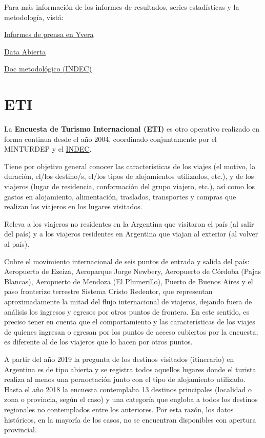 \documentclass[
  openany]{book}
\begin{document}
Para más información de los informes de resultados, series estadísticas y la metodología, vistá:

\href{https://www.yvera.tur.ar/estadistica/info/encuesta-de-ocupacion-hotelera-eoh}{Informes de prensa en Yvera}

\href{http://datos.yvera.tur.ar/dataset/encuesta-ocupacion-hotelera-parahotelera-eoh}{Data Abierta}

\href{https://www.indec.gob.ar/ftp/cuadros/economia/eoh_aspectos_metodologicos.pdf}{Doc metodológico (INDEC)}

\hypertarget{eti}{%
\section{ETI}\label{eti}}

La \textbf{Encuesta de Turismo Internacional (ETI)} es otro operativo realizado en forma continua desde el año 2004, coordinado conjuntamente por el MINTURDEP y el \href{https://www.indec.gob.ar/indec/web/Nivel4-Tema-3-13-55}{INDEC}.

Tiene por objetivo general conocer las características de los viajes (el motivo, la duración, el/los destino/s, el/los tipos de alojamientos utilizados, etc.), y de los viajeros (lugar de residencia, conformación del grupo viajero, etc.), así como los gastos en alojamiento, alimentación, traslados, transportes y compras que realizan los viajeros en los lugares visitados.

Releva a los viajeros no residentes en la Argentina que visitaron el país (al salir del país) y a los viajeros residentes en Argentina que viajan al exterior (al volver al país).

Cubre el movimiento internacional de seis puntos de entrada y salida del país: Aeropuerto de Ezeiza, Aeroparque Jorge Newbery, Aeropuerto de Córdoba (Pajas Blancas), Aeropuerto de Mendoza (El Plumerillo), Puerto de Buenos Aires y el paso fronterizo terrestre Sistema Cristo Redentor, que representan aproximadamente la mitad del flujo internacional de viajeros, dejando fuera de análisis los ingresos y egresos por otros puntos de frontera.
En este sentido, es preciso tener en cuenta que el comportamiento y las características de los viajes de quienes ingresan o egresan por los puntos de acceso cubiertos por la encuesta, es diferente al de los viajeros que lo hacen por otros puntos.

A partir del año 2019 la pregunta de los destinos visitados (itinerario) en Argentina es de tipo abierta y se registra todos aquellos lugares donde el turista realiza al menos una pernoctación junto con el tipo de alojamiento utilizado.
Hasta el año 2018 la encuesta contemplaba 13 destinos principales (localidad o zona o provincia, según el caso) y una categoría que engloba a todos los destinos regionales no contemplados entre los anteriores.
Por esta razón, los datos históricos, en la mayoría de los casos, no se encuentran disponibles con apertura provincial.
\end{document}
